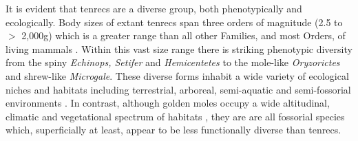 \documentclass[12pt,a4paper]{article}
\begin{document}
	
	
	
	
	It is evident that tenrecs are a diverse group, both phenotypically and ecologically. Body sizes of extant tenrecs span three orders of magnitude (2.5 to $>$ 2,000g) which is a greater range than all other Families, and most Orders, of living mammals \citep{Olson2003}.
	Within this vast size range there is striking phenotypic diversity from the spiny \textit{Echinops, Setifer} and \textit{Hemicentetes} to the mole-like \textit{Oryzorictes} and shrew-like \textit{Microgale}. These diverse forms inhabit a wide variety of ecological niches and habitats including terrestrial, arboreal, semi-aquatic and semi-fossorial environments \citep{Soarimalala2011}. 
	In contrast, although golden moles occupy a wide altitudinal, climatic and vegetational spectrum of habitats \citep{Bronner1995}, they are are all fossorial species which, superficially at least, appear to be less functionally diverse than tenrecs. 
	
	
\end{document}
